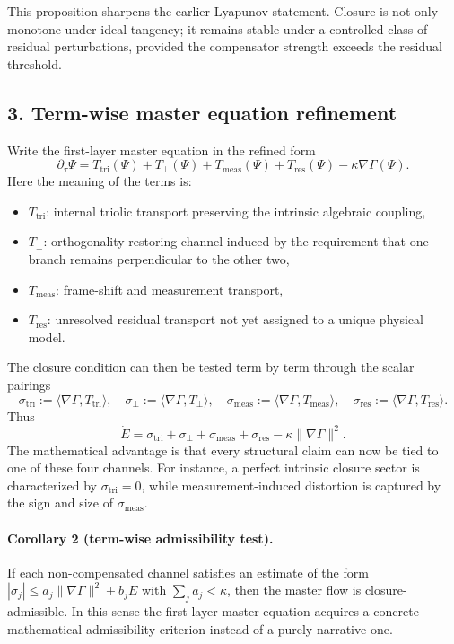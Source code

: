 This proposition sharpens the earlier Lyapunov statement. Closure is not only
monotone under ideal tangency; it remains stable under a controlled class of
residual perturbations, provided the compensator strength exceeds the residual
threshold.

\subsection*{3. Term-wise master equation refinement}
Write the first-layer master equation in the refined form
\[
\partial_\tau \Psi
= T_{\mathrm{tri}}(\Psi)
+ T_{\perp}(\Psi)
+ T_{\mathrm{meas}}(\Psi)
+ T_{\mathrm{res}}(\Psi)
- \kappa\nabla\Gamma(\Psi).
\]
Here the meaning of the terms is:
\begin{itemize}
    \item $T_{\mathrm{tri}}$: internal triolic transport preserving the intrinsic
    algebraic coupling,
    \item $T_{\perp}$: orthogonality-restoring channel induced by the requirement
    that one branch remains perpendicular to the other two,
    \item $T_{\mathrm{meas}}$: frame-shift and measurement transport,
    \item $T_{\mathrm{res}}$: unresolved residual transport not yet assigned to a
    unique physical model.
\end{itemize}
The closure condition can then be tested term by term through the scalar
pairings
\[
\sigma_{\mathrm{tri}}:=\langle \nabla\Gamma,T_{\mathrm{tri}}\rangle,
\quad
\sigma_{\perp}:=\langle \nabla\Gamma,T_{\perp}\rangle,
\quad
\sigma_{\mathrm{meas}}:=\langle \nabla\Gamma,T_{\mathrm{meas}}\rangle,
\quad
\sigma_{\mathrm{res}}:=\langle \nabla\Gamma,T_{\mathrm{res}}\rangle.
\]
Thus
\[
\dot E = \sigma_{\mathrm{tri}}+\sigma_{\perp}+\sigma_{\mathrm{meas}}+\sigma_{\mathrm{res}}
-\kappa\|\nabla\Gamma\|^2.
\]
The mathematical advantage is that every structural claim can now be tied to one
of these four channels. For instance, a perfect intrinsic closure sector is
characterized by $\sigma_{\mathrm{tri}}=0$, while measurement-induced distortion is
captured by the sign and size of $\sigma_{\mathrm{meas}}$.

\paragraph{Corollary 2 (term-wise admissibility test).}
If each non-compensated channel satisfies an estimate of the form
$|\sigma_j|\le a_j\|\nabla\Gamma\|^2+b_jE$ with $\sum_j a_j<\kappa$, then the
master flow is closure-admissible. In this sense the first-layer master
equation acquires a concrete mathematical admissibility criterion instead of a
purely narrative one.

